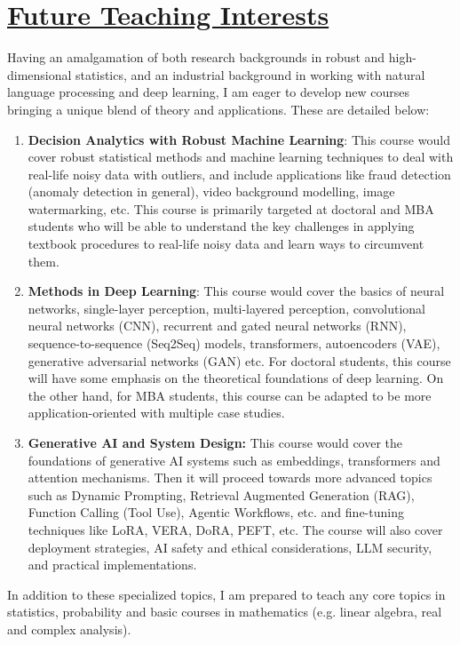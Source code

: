 \documentclass[a4paper,10pt]{article}
\begin{document}
\section*{\underline{Future Teaching Interests}}

Having an amalgamation of both research backgrounds in robust and high-dimensional statistics, and an industrial background in working with natural language processing and deep learning, I am eager to develop new courses bringing a unique blend of theory and applications. These are detailed below:
\begin{enumerate}
    \item \textbf{Decision Analytics with Robust Machine Learning}: This course would cover robust statistical methods and machine learning techniques to deal with real-life noisy data with outliers, and include applications like fraud detection (anomaly detection in general), video background modelling, image watermarking, etc. This course is primarily targeted at doctoral and MBA students who will be able to understand the key challenges in applying textbook procedures to real-life noisy data and learn ways to circumvent them.
    \item \textbf{Methods in Deep Learning}: This course would cover the basics of neural networks, single-layer perception, multi-layered perception, convolutional neural networks (CNN), recurrent and gated neural networks (RNN), sequence-to-sequence (Seq2Seq) models, transformers, autoencoders (VAE), generative adversarial networks (GAN) etc. For doctoral students, this course will have some emphasis on the theoretical foundations of deep learning. On the other hand, for MBA students, this course can be adapted to be more application-oriented with multiple case studies.
    \item \textbf{Generative AI and System Design:} This course would cover the foundations of generative AI systems such as embeddings, transformers and attention mechanisms. Then it will proceed towards more advanced topics such as Dynamic Prompting, Retrieval Augmented Generation (RAG), Function Calling (Tool Use), Agentic Workflows, etc. and fine-tuning techniques like LoRA, VERA, DoRA, PEFT, etc. The course will also cover deployment strategies, AI safety and ethical considerations, LLM security, and practical implementations.
\end{enumerate}
\noindent In addition to these specialized topics, I am prepared to teach any core topics in statistics, probability and basic courses in mathematics (e.g. linear algebra, real and complex analysis).
\end{document}
